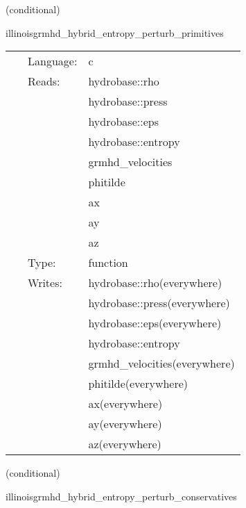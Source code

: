 \vspace{5mm}

   (conditional) 

\hspace{5mm} illinoisgrmhd\_hybrid\_entropy\_perturb\_primitives 

\hspace{5mm}{\it entropy+hybrid version of illinoisgrmhd\_perturb\_primitives } 


\hspace{5mm}

 \begin{tabular*}{160mm}{cll} 
~ & Language:  & c \\ 
~ & Reads:  & hydrobase::rho \\ 
~& ~ &hydrobase::press\\ 
~& ~ &hydrobase::eps\\ 
~& ~ &hydrobase::entropy\\ 
~& ~ &grmhd\_velocities\\ 
~& ~ &phitilde\\ 
~& ~ &ax\\ 
~& ~ &ay\\ 
~& ~ &az\\ 
~ & Type:  & function \\ 
~ & Writes:  & hydrobase::rho(everywhere) \\ 
~& ~ &hydrobase::press(everywhere)\\ 
~& ~ &hydrobase::eps(everywhere)\\ 
~& ~ &hydrobase::entropy\\ 
~& ~ &grmhd\_velocities(everywhere)\\ 
~& ~ &phitilde(everywhere)\\ 
~& ~ &ax(everywhere)\\ 
~& ~ &ay(everywhere)\\ 
~& ~ &az(everywhere)\\ 
\end{tabular*} 


\vspace{5mm}

   (conditional) 

\hspace{5mm} illinoisgrmhd\_hybrid\_entropy\_perturb\_conservatives 

\hspace{5mm}{\it entropy+hybrid version of illinoisgrmhd\_perturb\_conservatives } 



